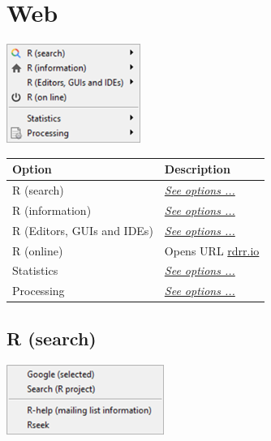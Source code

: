 
\hypertarget{menu_web}{}
\section{Web}

\includegraphics[scale=0.50]{./res/menu_web.png}\\

\begin{scriptsize}
  \begin{tabularx}{\textwidth}{>{\hsize=0.3\hsize}X>{\hsize=0.7\hsize}X}\\
    \hline
    \textbf{Option} & \textbf{Description} \\
    \hline
    R (search) & \textit{\href{\#menu\_web\_rsearch}{See options ...}} \\
    R (information) & \textit{\href{\#menu\_web\_rinformation}{See options ...}} \\
    R (Editors, GUIs and IDEs) & \textit{\href{\#menu\_web\_rguis}{See options ...}} \\
    R (online) & Opens URL \href{https://rdrr.io/snippets/}{rdrr.io} \\
    \hdashline[1pt/1pt]
    Statistics & \textit{\href{\#menu\_web\_statistics}{See options ...}} \\
    Processing & \textit{\href{\#menu\_web\_processing}{See options ...}} \\
    \hline
  \end{tabularx}
\end{scriptsize}


\hypertarget{menu_web_rsearch}{}
\subsection{R (search)}

\includegraphics[scale=0.50]{./res/menu_web_rsearch.png}\\

